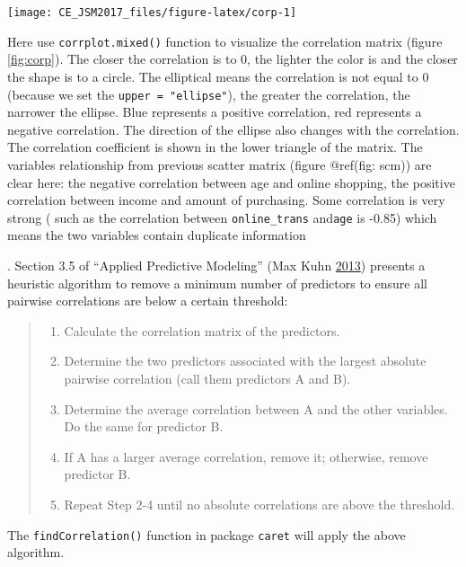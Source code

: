 \documentclass[]{book}
\providecommand{\tightlist}{%
  \setlength{\itemsep}{0pt}\setlength{\parskip}{0pt}}
\theoremstyle{definition}
\theoremstyle{definition}
\theoremstyle{remark}
\begin{document}
\begin{center}\texttt{[image: CE\_JSM2017\_files/figure-latex/corp-1]} \end{center}

Here use \texttt{corrplot.mixed()} function to visualize the correlation
matrix (figure \ref{fig:corp}). The closer the correlation is to 0, the
lighter the color is and the closer the shape is to a circle. The
elliptical means the correlation is not equal to 0 (because we set the
\texttt{upper\ =\ "ellipse"}), the greater the correlation, the narrower
the ellipse. Blue represents a positive correlation, red represents a
negative correlation. The direction of the ellipse also changes with the
correlation. The correlation coefficient is shown in the lower triangle
of the matrix. The variables relationship from previous scatter matrix
(figure @ref(fig: scm)) are clear here: the negative correlation between
age and online shopping, the positive correlation between income and
amount of purchasing. Some correlation is very strong ( such as the
correlation between \texttt{online\_trans} and\texttt{age} is -0.85)
which means the two variables contain duplicate information

. Section 3.5 of ``Applied Predictive Modeling'' (Max Kuhn
\protect\hyperlink{ref-APM}{2013}) presents a heuristic algorithm to
remove a minimum number of predictors to ensure all pairwise
correlations are below a certain threshold:

\begin{quote}
\begin{enumerate}
\def\labelenumi{(\arabic{enumi})}
\tightlist
\item
  Calculate the correlation matrix of the predictors.
\item
  Determine the two predictors associated with the largest absolute
  pairwise correlation (call them predictors A and B).
\item
  Determine the average correlation between A and the other variables.
  Do the same for predictor B.
\item
  If A has a larger average correlation, remove it; otherwise, remove
  predictor B.
\item
  Repeat Step 2-4 until no absolute correlations are above the
  threshold.
\end{enumerate}
\end{quote}

The \texttt{findCorrelation()} function in package \texttt{caret} will
apply the above algorithm.
\end{document}
